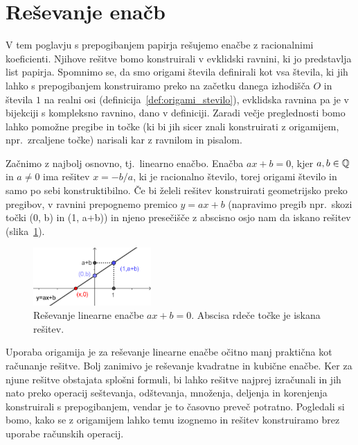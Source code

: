 \section{Reševanje enačb}
\label{pogl:enacbe}

V tem poglavju s prepogibanjem papirja rešujemo enačbe z racionalnimi koeficienti. Njihove rešitve bomo konstruirali v evklidski ravnini, ki jo predstavlja list papirja. Spomnimo se, da smo origami števila definirali kot vsa števila, ki jih lahko s prepogibanjem konstruiramo preko na začetku danega izhodišča $O$ in števila $1$ na realni osi (definicija~\ref{def:origami_stevilo}), evklidska ravnina pa je v bijekciji s kompleksno ravnino, dano v definiciji. Zaradi večje preglednosti bomo lahko pomožne pregibe in točke (ki bi jih sicer znali konstruirati z origamijem, npr.\ zrcaljene točke) narisali kar z ravnilom in pisalom.

Začnimo z najbolj osnovno, tj.\ linearno enačbo. Enačba $ax + b = 0$, kjer $a, b \in \mathbb Q$ in $a \neq 0$ ima rešitev $x = -b/a$, ki je racionalno število, torej origami število in samo po sebi konstruktibilno. Če bi želeli rešitev konstruirati geometrijsko preko pregibov, v ravnini prepognemo premico $y = ax + b$ (napravimo pregib npr.\ skozi točki (0, b) in (1, a+b)) in njeno presečišče z abscisno osjo nam da iskano rešitev (slika~\ref{fig:lin_en}).

\begin{figure}[h]
    \centering
    \includegraphics[width=0.4\textwidth]{images/linearna_enacba.png}
    \caption[Reševanje linearne enačbe]{Reševanje linearne enačbe $ax+b=0$. Abscisa rdeče točke je iskana rešitev.}
    \label{fig:lin_en}
\end{figure}

Uporaba origamija je za reševanje linearne enačbe očitno manj praktična kot računanje rešitve. Bolj zanimivo je reševanje kvadratne in kubične enačbe. Ker za njune rešitve obstajata splošni formuli, bi lahko rešitve najprej izračunali in jih nato preko operacij seštevanja, odštevanja, množenja, deljenja in korenjenja konstruirali s prepogibanjem, vendar je to časovno preveč potratno. Pogledali si bomo, kako se z origamijem lahko temu izognemo in rešitev konstruiramo brez uporabe računskih operacij.

